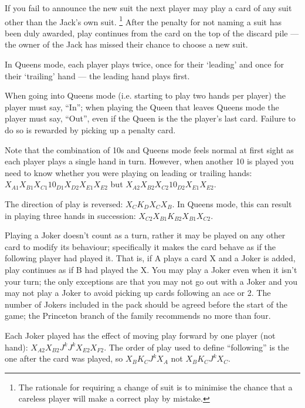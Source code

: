 \documentclass[12pt]{article}
\begin{document}
\begin{description}
    If you fail to announce the new suit the next player may play a card of any suit other than the Jack's own suit.%
    \footnote{The rationale for requiring a change of suit is to minimise the chance that
      a careless player will make a correct play by mistake.}
    After the penalty for not naming a suit has been duly awarded, play continues from the card on the top of the
    discard pile --- the owner of the Jack has missed their chance to choose a new suit.

  \item[\card{Queen}]
    In Queens mode, each player plays twice, once for their `leading' and once for their
    `trailing' hand --- the leading hand plays first.

    When going into Queens mode (i.e. starting to play two hands per player) the player must say, ``In''; when playing
    the Queen that leaves Queens mode the player must say, ``Out'', even if the Queen is the the player's
    last card. Failure to do so is rewarded by picking up a penalty card.  

    Note that the combination of 10s and Queens mode feels normal at first sight as each player plays a single hand in
    turn.  However, when another 10 is played you need to know whether you were playing on leading or trailing
    hands: $X_{A1} X_{B1} X_{C1} 10_{D1} X_{D2} X_{E1} X_{E2}$ but $X_{A2} X_{B2} X_{C2} 10_{D2} X_{E1} X_{E2}$.

  \item[\card{King}]
    The direction of play is reversed: $X_C K_D X_C X_B$.  In Queens mode, this can result in playing
    three hands in succession: $X_{C2} X_{B1} K_{B2} X_{B1} X_{C2}$.

  \item[\card{Joker}]

    Playing a Joker doesn't count as a turn, rather it may be played on any other card to modify its
    behaviour; specifically it makes the card behave as if the following player had played it. That is, if A
    plays a card X and a Joker is added, play continues as if B had played the X.  You may play a Joker even
    when it isn't your turn; the only exceptions are that you may not go out with a Joker and you may not play
    a Joker to avoid picking up cards following an ace or 2.  The number of Jokers included in the pack should
    be agreed before the start of the game; the Princeton branch of the family recommends no more than four.

    Each Joker played has the effect of moving play forward by one player (not hand): $X_{A2} X_{B2} J^k J^k
    X_{E2} X_{F2}$.  The order of play used to define ``following'' is the one after the card was played, so
    $X_B K_C J^k X_A$ not $X_B K_C J^k X_C$.


\end{description}
\end{document}
